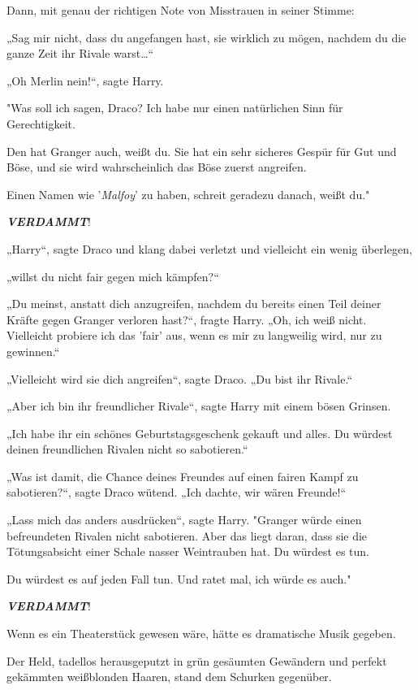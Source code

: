 {Dann, mit genau der richtigen Note von Misstrauen in seiner Stimme:

„Sag mir nicht, dass du angefangen hast, sie wirklich zu mögen, nachdem du die ganze Zeit ihr Rivale warst…“

„Oh Merlin nein!“, sagte Harry.

"Was soll ich sagen, Draco? Ich habe nur einen natürlichen Sinn für Gerechtigkeit.

Den hat Granger auch, weißt du. Sie hat ein sehr sicheres Gespür für Gut und Böse, und sie wird wahrscheinlich das Böse zuerst angreifen.

Einen Namen wie '\emph{Malfoy}' zu haben, schreit geradezu danach, weißt du."

\textbf{\emph{VERDAMMT}}!

„Harry“, sagte Draco und klang dabei verletzt und vielleicht ein wenig überlegen,

„willst du nicht fair gegen mich kämpfen?“

„Du meinst, anstatt dich anzugreifen, nachdem du bereits einen Teil deiner Kräfte gegen Granger verloren hast?“, fragte Harry. „Oh, ich weiß nicht. Vielleicht probiere ich das 'fair' aus, wenn es mir zu langweilig wird, nur zu gewinnen.“

„Vielleicht wird sie dich angreifen“, sagte Draco. „Du bist ihr Rivale.“

„Aber ich bin ihr freundlicher Rivale“, sagte Harry mit einem bösen Grinsen.

„Ich habe ihr ein schönes Geburtstagsgeschenk gekauft und alles. Du würdest deinen freundlichen Rivalen nicht so sabotieren.“

„Was ist damit, die Chance deines Freundes auf einen fairen Kampf zu sabotieren?“, sagte Draco wütend. „Ich dachte, wir wären Freunde!“

„Lass mich das anders ausdrücken“, sagte Harry. "Granger würde einen befreundeten Rivalen nicht sabotieren. Aber das liegt daran, dass sie die Tötungsabsicht einer Schale nasser Weintrauben hat. Du würdest es tun.

Du würdest es auf jeden Fall tun. Und ratet mal, ich würde es auch."

\textbf{\emph{VERDAMMT}}!

Wenn es ein Theaterstück gewesen wäre, hätte es dramatische Musik gegeben.

Der Held, tadellos herausgeputzt in grün gesäumten Gewändern und perfekt gekämmten weißblonden Haaren, stand dem Schurken gegenüber.

}
